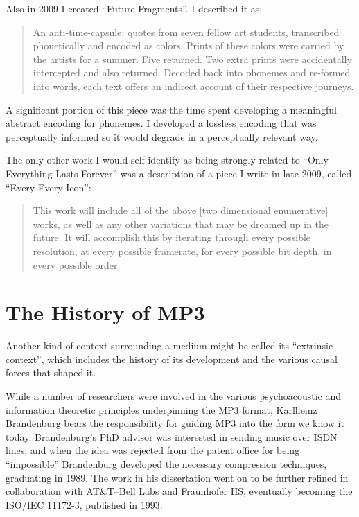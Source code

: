 \documentclass{thesis}
\begin{document}
Also in 2009 I created ``Future Fragments''. I described it as:
	
	\begin{quote}
	An anti-time-capsule: quotes from seven fellow art students, transcribed phonetically and encoded as colors. Prints of these colors were carried by the artists for a summer. Five returned. Two extra prints were accidentally intercepted and also returned. Decoded back into phonemes and re-formed into words, each text offers an indirect account of their respective journeys.\cite{kyle_mcdonald_future_2008}
	\end{quote}

A significant portion of this piece was the time spent developing a meaningful abstract encoding for phonemes. I developed a lossless encoding that was perceptually informed so it would degrade in a perceptually relevant way.

The only other work I would self-identify as being strongly related to ``Only Everything Lasts Forever'' was a description of a piece I write in late 2009, called ``Every Every Icon'':
	
	\begin{quote}
	This work will include all of the above [two dimensional enumerative] works, as well as any other variations that may be dreamed up in the future. It will accomplish this by iterating through every possible resolution, at every possible framerate, for every possible bit depth, in every possible order.\cite{kyle_mcdonald_every_2009-1}
	\end{quote}	

\section{The History of MP3}

Another kind of context surrounding a medium might be called its ``extrinsic context'', which includes the history of its development and the various causal forces that shaped it.

While a number of researchers were involved in the various psychoacoustic and information theoretic principles underpinning the MP3 format, Karlheinz Brandenburg bears the responsibility for guiding MP3 into the form we know it today. Brandenburg's PhD advisor was interested in sending music over ISDN lines, and when the idea was rejected from the patent office for being ``impossible'' Brandenburg developed the necessary compression techniques, graduating in 1989\cite{brandenburg_interviews_2004}. The work in his dissertation went on to be further refined in collaboration with AT\&T--Bell Labs and Fraunhofer IIS, eventually becoming the ISO/IEC 11172-3, published in 1993.
\end{document}

